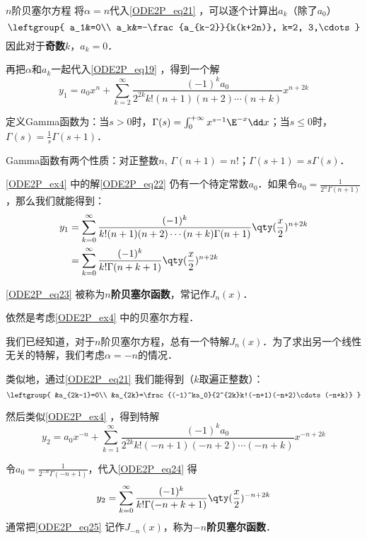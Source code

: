 \begin{example}{$n$阶贝塞尔方程}
将$\alpha=n$代入\autoref{ODE2P_eq21} ，可以逐个计算出$a_k$（除了$a_0$）
\begin{equation}
\leftgroup{
    a_1&=0\\
    a_k&=-\frac{a_{k-2}}{k(k+2n)}, k=2, 3,\cdots
}
\end{equation}
因此对于\textbf{奇数}$k$，$a_k=0$．

再把$\alpha$和$a_k$一起代入\autoref{ODE2P_eq19} ，得到一个解
\begin{equation}\label{ODE2P_eq22}
y_1=a_0x^n+\sum\limits^\infty_{k=2}\frac{(-1)^ka_0}{2^{2k}k!(n+1)(n+2)\cdots(n+k)}x^{n+2k}
\end{equation}


定义Gamma函数为：当$s>0$时，$\Gamma(s)=\int_0^{+\infty}x^{s-1}\E^{-x}\dd x$；当$s\leq 0$时，$\Gamma(s)=\frac{1}{s}\Gamma(s+1)$．

Gamma函数有两个性质：对正整数$n$, $\Gamma(n+1)=n!$；$\Gamma(s+1)=s\Gamma(s)$．

\autoref{ODE2P_ex4}  中的解\autoref{ODE2P_eq22} 仍有一个待定常数$a_0$．如果令$a_0=\frac{1}{2^n\Gamma(n+1)}$，那么我们就能得到：
\begin{equation}\label{ODE2P_eq23}
\begin{aligned}
y_1&=\sum\limits^\infty_{k=0}\frac{(-1)^k}{k!(n+1)(n+2)\cdots(n+k)\Gamma(n+1)}\qty(\frac{x}{2})^{n+2k}\\
 &=\sum\limits^\infty_{k=0}\frac{(-1)^k}{k!\Gamma(n+k+1)}\qty(\frac{x}{2})^{n+2k}
\end{aligned}
\end{equation}

\autoref{ODE2P_eq23} 被称为\textbf{$n$阶贝塞尔函数}，常记作$J_n(x)$．


\end{example}



\begin{example}{}
依然是考虑\autoref{ODE2P_ex4} 中的贝塞尔方程．

我们已经知道，对于$n$阶贝塞尔方程，总有一个特解$J_n(x)$．为了求出另一个线性无关的特解，我们考虑$\alpha=-n$的情况．

类似地，通过\autoref{ODE2P_eq21} 我们能得到（$k$取遍正整数）：
\begin{equation}
\leftgroup{
    &a_{2k-1}=0\\
    &a_{2k}=\frac{(-1)^ka_0}{2^{2k}k!(-n+1)(-n+2)\cdots(-n+k)}
}
\end{equation}

然后类似\autoref{ODE2P_ex4} ，得到特解
\begin{equation}\label{ODE2P_eq24}
y_2=a_0x^{-n}+\sum\limits^\infty_{k=1}\frac{(-1)^ka_0}{2^{2k}k!(-n+1)(-n+2)\cdots(-n+k)}x^{-n+2k}
\end{equation}

令$a_0=\frac{1}{2^{-n}\Gamma(-n+1)}$，代入\autoref{ODE2P_eq24} 得
\begin{equation}\label{ODE2P_eq25}
y_2=\sum\limits^\infty_{k=0}\frac{(-1)^k}{k!\Gamma(-n+k+1)}\qty(\frac{x}{2})^{-n+2k}
\end{equation}
通常把\autoref{ODE2P_eq25} 记作$J_{-n}(x)$，称为\textbf{$-n$阶贝塞尔函数}．



\end{example}

